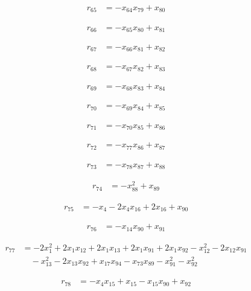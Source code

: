 \begin{align*}
r_{65}&=-x_{64}x_{79}+x_{80}
\end{align*}

\begin{align*}
r_{66}&=-x_{65}x_{80}+x_{81}
\end{align*}

\begin{align*}
r_{67}&=-x_{66}x_{81}+x_{82}
\end{align*}

\begin{align*}
r_{68}&=-x_{67}x_{82}+x_{83}
\end{align*}

\begin{align*}
r_{69}&=-x_{68}x_{83}+x_{84}
\end{align*}

\begin{align*}
r_{70}&=-x_{69}x_{84}+x_{85}
\end{align*}

\begin{align*}
r_{71}&=-x_{70}x_{85}+x_{86}
\end{align*}

\begin{align*}
r_{72}&=-x_{77}x_{86}+x_{87}
\end{align*}

\begin{align*}
r_{73}&=-x_{78}x_{87}+x_{88}
\end{align*}

\begin{align*}
r_{74}&=-x_{88}^{2}+x_{89}
\end{align*}

\begin{align*}
r_{75}&=-x_{4}-2x_{4}x_{16}+2x_{16}+x_{90}
\end{align*}

\begin{align*}
r_{76}&=-x_{14}x_{90}+x_{91}
\end{align*}

\begin{align*}
r_{77}&=-2x_{1}^{2}+2x_{1}x_{12}+2x_{1}x_{13}+2x_{1}x_{91}+2x_{1}x_{92}-x_{12}^{2}-2x_{12}x_{91}\\
&\quad -x_{13}^{2}-2x_{13}x_{92}+x_{17}x_{94}-x_{73}x_{89}-x_{91}^{2}-x_{92}^{2}
\end{align*}

\begin{align*}
r_{78}&=-x_{4}x_{15}+x_{15}-x_{15}x_{90}+x_{92}
\end{align*}


